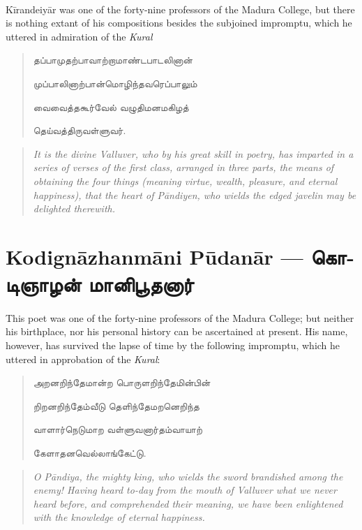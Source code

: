 \documentclass{article}
\newcommand{\TamilText}[1]{\texttamil{#1}}
\newcommand{\TamilBold}[1]{\texttamil{\textbf{#1}}}
\newcommand{\tam}[1]{\TamilText{#1}}
\newcommand{\tambold}[1]{\TamilBold{#1}}
\begin{document}
\paragraph{}
K\={i}randeiy\={a}r was one of the forty-nine professors of the Madura College, but there is nothing extant of his compositions besides the subjoined impromptu, which he uttered in admiration of the \emph{Kural} 
\begin{quotation}\small
\tam{தப்பாமுதற்பாவாற்றாமாண்டபாடலினான்‌}

\tam{முப்பாலினாற்பான்மொழிந்தவரெப்பாலும்‌}

\tam{வைவைத்தகூர்வேல்‌ வழுதிமனமகிழத்‌}

\tam{தெய்வத்திருவள்ளுவர்‌}.
\end{quotation}
\begin{quotation}\small
\emph{It is the divine Valluver, who by his great skill in poetry, has imparted in a series of verses of the first class, arranged in three parts, the means of obtaining the four things (meaning virtue, wealth, pleasure, and eternal happiness), that the heart of P\={a}ndiyen, who wields the edged javelin may be delighted therewith.}
\end{quotation}

\section{Kodign\={a}zhanm\={a}ni P\={u}dan\={a}r --- \tambold{கொடிஞாழன் மானிபூதனார்}}
\paragraph{}
This poet was one of the forty-nine professors of the Madura College; but neither his birthplace, nor his personal history can be ascertained at present. His name, however, has survived the lapse of time by the following impromptu, which he uttered in approbation of the \emph{Kural}:
\begin{quotation}\small
\tam{அறனறிந்தேமான்ற பொருளறிந்தேமின்‌பின்‌}

\tam{றிறனறிந்தேம்வீடு தெளிந்தேமறனெறிந்த}

\tam{வாளார்நெடுமாற வள்ளுவனார்தம்வாயாற்‌}

\tam{கேளாதனவெல்லாங்கேட்டு}.
\end{quotation}
\begin{quotation}\small
\emph{O P\={a}ndiya, the mighty king, who wields the sword brandished among the enemy! Having heard to-day from the mouth of Valluver what we never heard before, and comprehended their meaning, we have been enlightened with the knowledge of eternal happiness.}
\end{quotation}
\end{document}

